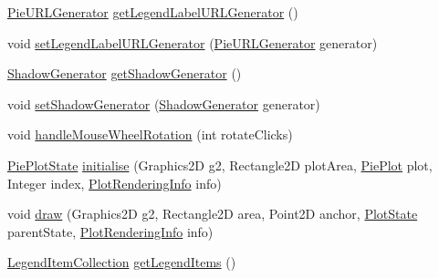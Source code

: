 \begin{DoxyCompactItemize}
\item 
\mbox{\hyperlink{interfaceorg_1_1jfree_1_1chart_1_1urls_1_1_pie_u_r_l_generator}{Pie\+U\+R\+L\+Generator}} \mbox{\hyperlink{classorg_1_1jfree_1_1chart_1_1plot_1_1_pie_plot_a504f2ae046fabdf07dcef72fc1c3d3a5}{get\+Legend\+Label\+U\+R\+L\+Generator}} ()
\item 
void \mbox{\hyperlink{classorg_1_1jfree_1_1chart_1_1plot_1_1_pie_plot_a68b18f13f2db07d91dbdbc4b83ea8057}{set\+Legend\+Label\+U\+R\+L\+Generator}} (\mbox{\hyperlink{interfaceorg_1_1jfree_1_1chart_1_1urls_1_1_pie_u_r_l_generator}{Pie\+U\+R\+L\+Generator}} generator)
\item 
\mbox{\hyperlink{interfaceorg_1_1jfree_1_1chart_1_1util_1_1_shadow_generator}{Shadow\+Generator}} \mbox{\hyperlink{classorg_1_1jfree_1_1chart_1_1plot_1_1_pie_plot_a19e07e6891fef6f7645842473bee4d4d}{get\+Shadow\+Generator}} ()
\item 
void \mbox{\hyperlink{classorg_1_1jfree_1_1chart_1_1plot_1_1_pie_plot_a6b869408d47c89e6d9115101faecd8f4}{set\+Shadow\+Generator}} (\mbox{\hyperlink{interfaceorg_1_1jfree_1_1chart_1_1util_1_1_shadow_generator}{Shadow\+Generator}} generator)
\item 
void \mbox{\hyperlink{classorg_1_1jfree_1_1chart_1_1plot_1_1_pie_plot_a4ec2feb277a330f9c9b1dc1fd554362d}{handle\+Mouse\+Wheel\+Rotation}} (int rotate\+Clicks)
\item 
\mbox{\hyperlink{classorg_1_1jfree_1_1chart_1_1plot_1_1_pie_plot_state}{Pie\+Plot\+State}} \mbox{\hyperlink{classorg_1_1jfree_1_1chart_1_1plot_1_1_pie_plot_a156604874bd3cfadee0f85e1b9066eaa}{initialise}} (Graphics2D g2, Rectangle2D plot\+Area, \mbox{\hyperlink{classorg_1_1jfree_1_1chart_1_1plot_1_1_pie_plot}{Pie\+Plot}} plot, Integer index, \mbox{\hyperlink{classorg_1_1jfree_1_1chart_1_1plot_1_1_plot_rendering_info}{Plot\+Rendering\+Info}} info)
\item 
void \mbox{\hyperlink{classorg_1_1jfree_1_1chart_1_1plot_1_1_pie_plot_a80ab6a9db3c5ab6da9a3242b98b297d3}{draw}} (Graphics2D g2, Rectangle2D area, Point2D anchor, \mbox{\hyperlink{classorg_1_1jfree_1_1chart_1_1plot_1_1_plot_state}{Plot\+State}} parent\+State, \mbox{\hyperlink{classorg_1_1jfree_1_1chart_1_1plot_1_1_plot_rendering_info}{Plot\+Rendering\+Info}} info)
\item 
\mbox{\hyperlink{classorg_1_1jfree_1_1chart_1_1_legend_item_collection}{Legend\+Item\+Collection}} \mbox{\hyperlink{classorg_1_1jfree_1_1chart_1_1plot_1_1_pie_plot_a6bb041de79edb3351e574497d83f71cb}{get\+Legend\+Items}} ()
\item 

\end{DoxyCompactItemize}
